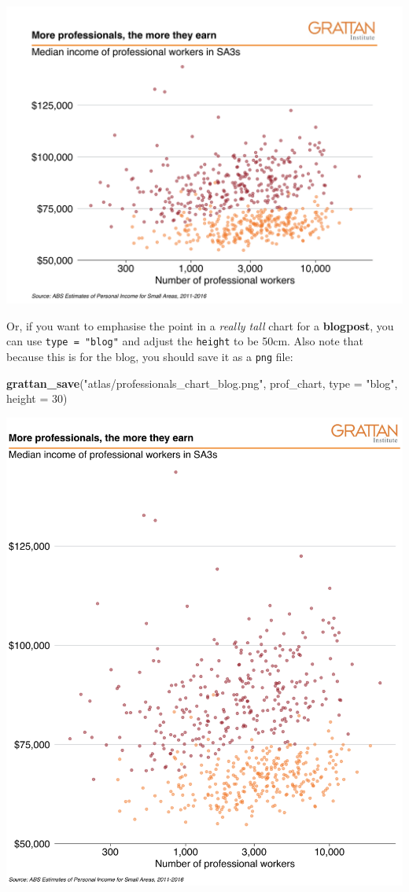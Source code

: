 \documentclass[]{book}
\newenvironment{Shaded}{\begin{snugshade}}{\end{snugshade}}
\newcommand{\DataTypeTok}[1]{\textcolor[rgb]{0.13,0.29,0.53}{#1}}
\newcommand{\DecValTok}[1]{\textcolor[rgb]{0.00,0.00,0.81}{#1}}
\newcommand{\KeywordTok}[1]{\textcolor[rgb]{0.13,0.29,0.53}{\textbf{#1}}}
\newcommand{\NormalTok}[1]{#1}
\newcommand{\StringTok}[1]{\textcolor[rgb]{0.31,0.60,0.02}{#1}}
\begin{document}
\includegraphics[width=44.44in]{atlas/professionals_chart_presentation}

Or, if you want to emphasise the point in a \emph{really tall} chart for a \textbf{blogpost}, you can use \texttt{type\ =\ "blog"} and adjust the \texttt{height} to be 50cm. Also note that because this is for the blog, you should save it as a \texttt{png} file:

\begin{Shaded}
\begin{Highlighting}[]
\KeywordTok{grattan_save}\NormalTok{(}\StringTok{"atlas/professionals_chart_blog.png"}\NormalTok{, prof_chart, }
             \DataTypeTok{type =} \StringTok{"blog"}\NormalTok{, }\DataTypeTok{height =} \DecValTok{30}\NormalTok{)}
\end{Highlighting}
\end{Shaded}

\includegraphics[width=44.44in]{atlas/professionals_chart_blog}
\end{document}
